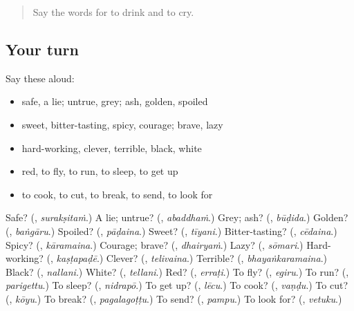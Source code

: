 \label{lesson:TE-R149-first-pass-describing-words-and-verbs}



\begin{quote}
Say the words for to drink and to cry.
\end{quote}

\subsection*{Your turn}
Say these aloud:

\begin{itemize}
\raggedright
  \item safe, a lie; untrue, grey; ash, golden, spoiled
  \item sweet, bitter-tasting, spicy, courage; brave, lazy
  \item hard-working, clever, terrible, black, white
  \item red, to fly, to run, to sleep, to get up
  \item to cook, to cut, to break, to send, to look for
\end{itemize}

\begin{tcolorbox}[breakable,colback=teal!4,colframe=teal!35!black,title={Before you move on}]
Safe? (\textbf{}, \emph{surakṣitaṁ}.) A lie; untrue? (\textbf{}, \emph{abaddhaṁ}.) Grey; ash? (\textbf{}, \emph{būḍida}.) Golden? (\textbf{}, \emph{baṅgāru}.) Spoiled? (\textbf{}, \emph{pāḍaina}.) Sweet? (\textbf{}, \emph{tīyani}.) Bitter-tasting? (\textbf{}, \emph{cēdaina}.) Spicy? (\textbf{}, \emph{kāramaina}.) Courage; brave? (\textbf{}, \emph{dhairyaṁ}.) Lazy? (\textbf{}, \emph{sōmari}.) Hard-working? (\textbf{}, \emph{kaṣṭapaḍē}.) Clever? (\textbf{}, \emph{telivaina}.) Terrible? (\textbf{}, \emph{bhayaṅkaramaina}.) Black? (\textbf{}, \emph{nallani}.) White? (\textbf{}, \emph{tellani}.) Red? (\textbf{}, \emph{erraṭi}.) To fly? (\textbf{}, \emph{egiru}.) To run? (\textbf{}, \emph{parigettu}.) To sleep? (\textbf{}, \emph{nidrapō}.) To get up? (\textbf{}, \emph{lēcu}.) To cook? (\textbf{}, \emph{vaṇḍu}.) To cut? (\textbf{}, \emph{kōyu}.) To break? (\textbf{}, \emph{pagalagoṭṭu}.) To send? (\textbf{}, \emph{pampu}.) To look for? (\textbf{}, \emph{vetuku}.)
\end{tcolorbox}
